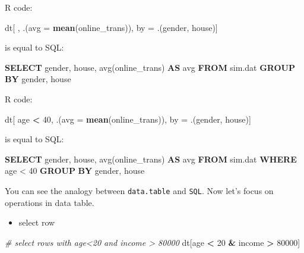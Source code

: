 \documentclass[12pt,]{krantz}
\makeatletter
\newenvironment{Shaded}{\begin{snugshade}}{\end{snugshade}}
\newcommand{\CommentTok}[1]{\textcolor[rgb]{0.37,0.37,0.37}{\textit{#1}}}
\newcommand{\DataTypeTok}[1]{\textcolor[rgb]{0.27,0.27,0.27}{#1}}
\newcommand{\DecValTok}[1]{\textcolor[rgb]{0.06,0.06,0.06}{#1}}
\newcommand{\FunctionTok}[1]{\textcolor[rgb]{0,0,0}{#1}}
\newcommand{\KeywordTok}[1]{\textcolor[rgb]{0.27,0.27,0.27}{\textbf{#1}}}
\newcommand{\NormalTok}[1]{#1}
\newcommand{\OperatorTok}[1]{\textcolor[rgb]{0.43,0.43,0.43}{\textbf{#1}}}
\newcommand{\StringTok}[1]{\textcolor[rgb]{0.5,0.5,0.5}{#1}}
\providecommand{\tightlist}{%
  \setlength{\itemsep}{0pt}\setlength{\parskip}{0pt}}
\newenvironment{kframe}{%
\medskip{}
\setlength{\fboxsep}{.8em}
 \def\at@end@of@kframe{}%
 \ifinner\ifhmode%
  \def\at@end@of@kframe{\end{minipage}}%
  \begin{minipage}{\columnwidth}%
 \fi\fi%
 \def\FrameCommand##1{\hskip\@totalleftmargin \hskip-\fboxsep
 \colorbox{shadecolor}{##1}\hskip-\fboxsep
     \hskip-\linewidth \hskip-\@totalleftmargin \hskip\columnwidth}%
 \MakeFramed {\advance\hsize-\width
   \@totalleftmargin\z@ \linewidth\hsize
   \@setminipage}}%
 {\par\unskip\endMakeFramed%
 \at@end@of@kframe}
\renewenvironment{Shaded}{\begin{kframe}}{\end{kframe}}
\makeatother
\begin{document}
R code:

\begin{Shaded}
\begin{Highlighting}[]
\NormalTok{dt[ , .(}\DataTypeTok{avg =} \KeywordTok{mean}\NormalTok{(online_trans)), by =}\StringTok{ }\NormalTok{.(gender, house)]}
\end{Highlighting}
\end{Shaded}

is equal to SQL:

\begin{Shaded}
\begin{Highlighting}[]
\KeywordTok{SELECT}
\NormalTok{   gender,}
\NormalTok{   house,}
   \FunctionTok{avg}\NormalTok{(online_trans) }\KeywordTok{AS} \FunctionTok{avg} 
\KeywordTok{FROM}
\NormalTok{   sim.dat }
\KeywordTok{GROUP} \KeywordTok{BY}
\NormalTok{   gender,}
\NormalTok{   house}
\end{Highlighting}
\end{Shaded}

R code:

\begin{Shaded}
\begin{Highlighting}[]
\NormalTok{dt[ age }\OperatorTok{<}\StringTok{ }\DecValTok{40}\NormalTok{, .(}\DataTypeTok{avg =} \KeywordTok{mean}\NormalTok{(online_trans)), by =}\StringTok{ }\NormalTok{.(gender, house)]}
\end{Highlighting}
\end{Shaded}

is equal to SQL:

\begin{Shaded}
\begin{Highlighting}[]
\KeywordTok{SELECT}
\NormalTok{   gender,}
\NormalTok{   house,}
   \FunctionTok{avg}\NormalTok{(online_trans) }\KeywordTok{AS} \FunctionTok{avg} 
\KeywordTok{FROM}
\NormalTok{   sim.dat }
\KeywordTok{WHERE}
\NormalTok{   age < }\DecValTok{40} 
\KeywordTok{GROUP} \KeywordTok{BY}
\NormalTok{   gender,}
\NormalTok{   house}
\end{Highlighting}
\end{Shaded}

You can see the analogy between \texttt{data.table} and \texttt{SQL}. Now let's focus on operations in data table.

\begin{itemize}
\tightlist
\item
  select row
\end{itemize}

\begin{Shaded}
\begin{Highlighting}[]
\CommentTok{# select rows with age<20 and income > 80000}
\NormalTok{dt[age }\OperatorTok{<}\StringTok{ }\DecValTok{20} \OperatorTok{&}\StringTok{ }\NormalTok{income }\OperatorTok{>}\StringTok{ }\DecValTok{80000}\NormalTok{]}
\end{Highlighting}
\end{Shaded}
\end{document}
